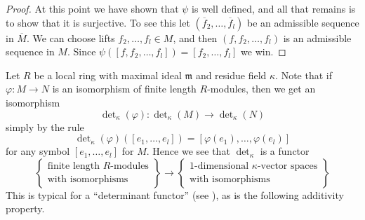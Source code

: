 \begin{proof}
\medskip\noindent
At this point we have shown that $\psi$ is well defined, and all that remains
is to show that it is surjective. To see this let
$(\overline{f}_2, \ldots, \overline{f}_l)$ be an admissible sequence
in $\overline{M}$. We can choose lifts $f_2, \ldots, f_l \in M$, and
then $(f, f_2, \ldots, f_l)$ is an admissible sequence in $M$.
Since $\psi([f, f_2, \ldots, f_l]) = [f_2, \ldots, f_l]$ we win.
\end{proof}

\noindent
Let $R$ be a local ring with maximal ideal $\mathfrak m$ and
residue field $\kappa$. Note that if $\varphi : M \to N$ is an
isomorphism of finite length $R$-modules, then we get an
isomorphism
$$
\det\nolimits_\kappa(\varphi) :
\det\nolimits_\kappa(M)
\to
\det\nolimits_\kappa(N)
$$
simply by the rule
$$
\det\nolimits_\kappa(\varphi)([e_1, \ldots, e_l])
=
[\varphi(e_1), \ldots, \varphi(e_l)]
$$
for any symbol $[e_1, \ldots, e_l]$ for $M$.
Hence we see that $\det\nolimits_\kappa$ is a functor
\begin{equation}
\label{equation-functor}
\left\{
\begin{matrix}
\text{finite length }R\text{-modules}\\
\text{with isomorphisms}
\end{matrix}
\right\}
\longrightarrow
\left\{
\begin{matrix}
1\text{-dimensional }\kappa\text{-vector spaces}\\
\text{with isomorphisms}
\end{matrix}
\right\}
\end{equation}
This is typical for a ``determinant functor''
(see \cite{Knudsen}), as is the following additivity
property.

